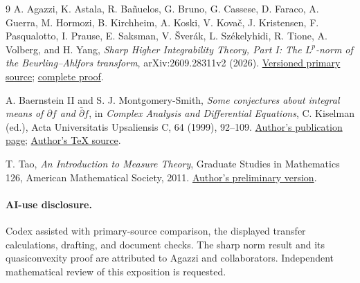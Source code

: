 \documentclass[11pt]{article}
\begin{document}
\begin{thebibliography}{9}
A. Agazzi, K. Astala, R. Ba\~nuelos, G. Bruno, G. Cassese,
D. Faraco, A. Guerra, M. Hormozi, B. Kirchheim, A. Koski,
V. Kova\v c, J. Kristensen, F. Pasqualotto, I. Prause,
E. Saksman, V. \v Sver\'ak, L. Sz\'ekelyhidi, R. Tione,
A. Volberg, and H. Yang,
\emph{Sharp Higher Integrability Theory, Part I:
The \(L^p\)-norm of the Beurling--Ahlfors transform},
arXiv:2609.28311v2 (2026).
\href{https://arxiv.org/abs/2609.28311v2}{Versioned primary source};
\href{https://arxiv.org/html/2609.28311v2}{complete proof}.

A. Baernstein II and S. J. Montgomery-Smith,
\emph{Some conjectures about integral means of \(\partial f\) and
\(\bar\partial f\)},
in \emph{Complex Analysis and Differential Equations},
C. Kiselman (ed.), Acta Universitatis Upsaliensis C,
64 (1999), 92--109.
\href{https://stephenmontgomerysmith.github.io/preprints/brn.html}
{Author's publication page};
\href{https://stephenmontgomerysmith.github.io/preprints/brn6.tex}
{Author's TeX source}.

T. Tao, \emph{An Introduction to Measure Theory},
Graduate Studies in Mathematics 126, American Mathematical Society, 2011.
\href{https://terrytao.wordpress.com/wp-content/uploads/2012/12/gsm-126-tao5-measure-book.pdf}
{Author's preliminary version}.
\end{thebibliography}

\paragraph{AI-use disclosure.}
Codex assisted with primary-source comparison, the displayed transfer
calculations, drafting, and document checks. The sharp norm result and its
quasiconvexity proof are attributed to Agazzi and collaborators.
Independent mathematical review of this exposition is requested.
\end{document}
